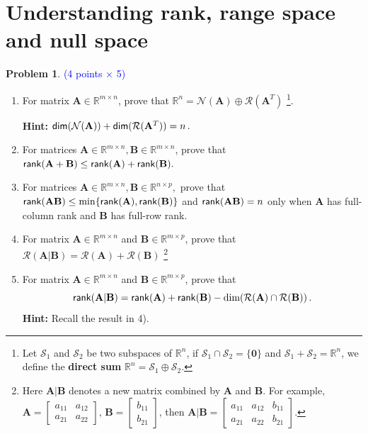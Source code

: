 \documentclass[english,onecolumn]{IEEEtran}
\begin{document}
\section{Understanding rank, range space and null space}
\textbf{Problem 1}. \textcolor{blue}{(4 points $\times$ 5)}
\begin{enumerate}
	\item For matrix $\mathbf{A}\in\mathbb{R}^{m\times n}$, prove that $\mathbb{R}^n = \mathcal{N}(\mathbf{A}) \oplus \mathcal{R}(\mathbf{A}^{T})$ \footnote{Let $\mathcal{S}_1$ and $\mathcal{S}_2$ be two subspaces of $\mathbb{R}^n$, if $\mathcal{S}_1 \cap \mathcal{S}_2 = \{ \mathbf{0}\}$ and $\mathcal{S}_1 + \mathcal{S}_2 = \mathbb{R}^n$, we define the \textbf{direct sum} $\mathbb{R}^n = \mathcal{S}_1 \oplus \mathcal{S}_2.$}.
	
	\textbf{Hint:} ${\sf dim}(\mathcal{N}(\mathbf{A})) + {\sf dim}(\mathcal{R}(\mathbf{A}^T)) = n\,.$
	
	\item For matrices $\mathbf{A}\in\mathbb{R}^{m\times n}, \mathbf{B}\in\mathbb{R}^{m\times n}$, prove that $ {\sf rank} (\mathbf{A}+\mathbf{B})\leq {\sf rank}(\mathbf{A}) + {\sf rank}(\mathbf{B}).$ 
	
	\item For matrices $\mathbf{A}\in\mathbb{R}^{m\times n}, \mathbf{B}\in\mathbb{R}^{n\times p},$ prove that ${\sf rank} (\mathbf{A B})\leq \min\{ {\sf rank}(\mathbf{A}), {\sf rank}(\mathbf{B}) \}$ and ${\sf rank}(\mathbf{AB}) = n$ only when $\mathbf{A}$ has full-column rank and $\mathbf{B}$ has full-row rank. 
		
	\item For matrix $\mathbf{A}\in\mathbb{R}^{m\times n}$ and $\mathbf{B}\in\mathbb{R}^{m\times p}$, prove that $\mathcal{R}(\mathbf{A|B}) = \mathcal{R}(\mathbf{A}) + \mathcal{R}(\mathbf{B})$
	\footnote{Here $\mathbf{A|B}$ denotes a new matrix combined by $\mathbf{A}$ and $\mathbf{B}$. For example, $\mathbf{A} = \begin{bmatrix}
		a_{11} & a_{12} \\
		a_{21} & a_{22}
		\end{bmatrix}$, $\mathbf{B} = \begin{bmatrix}
		b_{11} \\
		b_{21}
		\end{bmatrix}$, then $\mathbf{A|B} = \begin{bmatrix}
		a_{11} & a_{12} & b_{11} \\
		a_{21} & a_{22} & b_{21}
		\end{bmatrix}$.}
	
	\item  For matrix $\mathbf{A}\in\mathbb{R}^{m\times n}$ and $\mathbf{B}\in\mathbb{R}^{m\times p}$, prove that
	\[
	{\sf rank}(\mathbf{A|B}) = {\sf rank}(\mathbf{A}) + {\sf rank}(\mathbf{B})  - \text{dim}(\mathcal{R}(\mathbf{A})\cap \mathcal{R}(\mathbf{B}))\,.
	\]
	\textbf{Hint:} Recall the result in 4). 
\end{enumerate}
\end{document}
